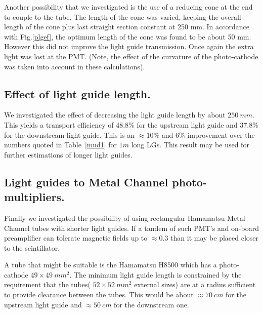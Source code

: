 Another possibility that we investigated is the use of a reducing cone at the end to couple to the tube. 
The length of the cone was varied, keeping the overall length of the cone plus last straight section constant at 250 mm. In accordance with Fig.\ref{plgef}, the optimum length of the cone was found to be about 50 mm. However this did not improve the light guide transmission.
Once again the extra light was lost at the PMT. (Note, the effect of the curvature of the photo-cathode was taken into account in these calculations).



\subsection{Effect of  light guide length.}
\label{mu8}
We investigated the effect of decreasing the light guide length by about $250~mm$.
This yields a transport efficiency of 48.8\% for the upstream light guide and 37.8\% for the downstream light guide.
This is an $\approx 10\%$ and $6\%$ improvement over the numbers quoted in Table~\ref{mud1} for $1m$ long LGs. 
This result may be used for further estimations of longer light guides.

\subsection{Light guides to  Metal Channel photo-multipliers.}
\label{mu9}
Finally we investigated the possibility of using rectangular Hamamatsu 
 Metal Channel tubes with shorter light guides. 
If a tandem of such PMT's  and on-board preamplifier can tolerate  magnetic fields up to $\approx0.3$ than  
it may  be placed closer to the scintillator.

A tube that might be suitable is the Hamamatsu H8500 which has a 
photo-cathode $49\times49~mm^2$.
The minimum light guide length 
is constrained by the requirement that the
 tubes( $52\times52~mm^2$ external sizes) are 
at a radius sufficient to provide clearance between the tubes. 
This would be about $\approx70~cm$ for the upstream light guide  and $\approx50~cm$ for the downstream one.

